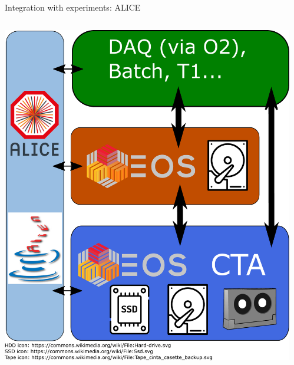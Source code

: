 \documentclass[aspectratio=169]{beamer}
\begin{document}
\begin{frame}{Integration with experiments: ALICE}
\begin{columns}
	\begin{column}{0.35\textwidth}
		\begin{center}
		  \includegraphics[keepaspectratio, height=0.8\textheight, width=1\textwidth]{../images/CTA_deployment_ALICE.pdf}
		\end{center}
	\end{column}
	\begin{column}{0.60\textwidth}
	\end{column}
\end{columns}
\end{frame}
\end{document}
